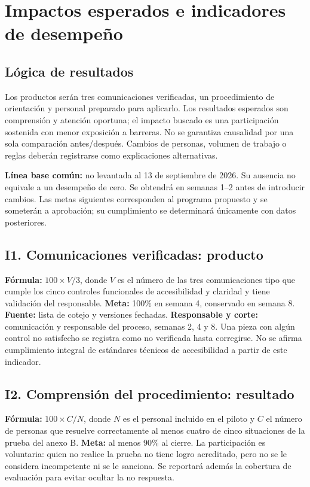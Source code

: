 \documentclass[12pt,letterpaper,oneside]{article}
\begin{document}
\section{Impactos esperados e indicadores de desempeño}
\subsection{Lógica de resultados}
Los productos serán tres comunicaciones verificadas, un procedimiento de orientación y personal preparado para aplicarlo. Los resultados esperados son comprensión y atención oportuna; el impacto buscado es una participación sostenida con menor exposición a barreras. No se garantiza causalidad por una sola comparación antes/después. Cambios de personas, volumen de trabajo o reglas deberán registrarse como explicaciones alternativas.

\textbf{Línea base común:} no levantada al 13 de septiembre de 2026. Su ausencia no equivale a un desempeño de cero. Se obtendrá en semanas 1--2 antes de introducir cambios. Las metas siguientes corresponden al programa propuesto y se someterán a aprobación; su cumplimiento se determinará únicamente con datos posteriores.

\subsection{I1. Comunicaciones verificadas: producto}
\textbf{Fórmula:} $100\times V/3$, donde $V$ es el número de las tres comunicaciones tipo que cumple los cinco controles funcionales de accesibilidad y claridad y tiene validación del responsable. \textbf{Meta:} 100\% en semana 4, conservado en semana 8. \textbf{Fuente:} lista de cotejo y versiones fechadas. \textbf{Responsable y corte:} comunicación y responsable del proceso, semanas 2, 4 y 8. Una pieza con algún control no satisfecho se registra como no verificada hasta corregirse. No se afirma cumplimiento integral de estándares técnicos de accesibilidad a partir de este indicador.

\subsection{I2. Comprensión del procedimiento: resultado}
\textbf{Fórmula:} $100\times C/N$, donde $N$ es el personal incluido en el piloto y $C$ el número de personas que resuelve correctamente al menos cuatro de cinco situaciones de la prueba del anexo B. \textbf{Meta:} al menos 90\% al cierre. La participación es voluntaria: quien no realice la prueba no tiene logro acreditado, pero no se le considera incompetente ni se le sanciona. Se reportará además la cobertura de evaluación para evitar ocultar la no respuesta.
\end{document}
